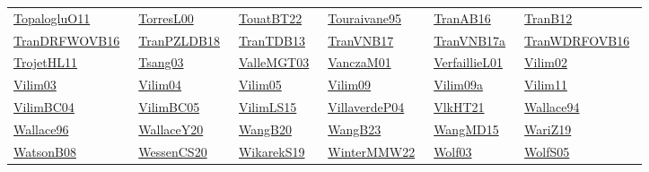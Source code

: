 \begin{longtable}{*{6}{l}}
\href{works/TopalogluO11.pdf}{TopalogluO11}~\cite{TopalogluO11} & \href{works/TorresL00.pdf}{TorresL00}~\cite{TorresL00} & \href{works/TouatBT22.pdf}{TouatBT22}~\cite{TouatBT22} & \href{works/Touraivane95.pdf}{Touraivane95}~\cite{Touraivane95} & \href{works/TranAB16.pdf}{TranAB16}~\cite{TranAB16} & \href{works/TranB12.pdf}{TranB12}~\cite{TranB12}\\ 
\href{works/TranDRFWOVB16.pdf}{TranDRFWOVB16}~\cite{TranDRFWOVB16} & \href{works/TranPZLDB18.pdf}{TranPZLDB18}~\cite{TranPZLDB18} & \href{works/TranTDB13.pdf}{TranTDB13}~\cite{TranTDB13} & \href{works/TranVNB17.pdf}{TranVNB17}~\cite{TranVNB17} & \href{works/TranVNB17a.pdf}{TranVNB17a}~\cite{TranVNB17a} & \href{works/TranWDRFOVB16.pdf}{TranWDRFOVB16}~\cite{TranWDRFOVB16}\\ 
\href{works/TrojetHL11.pdf}{TrojetHL11}~\cite{TrojetHL11} & \href{works/Tsang03.pdf}{Tsang03}~\cite{Tsang03} & \href{works/ValleMGT03.pdf}{ValleMGT03}~\cite{ValleMGT03} & \href{works/VanczaM01.pdf}{VanczaM01}~\cite{VanczaM01} & \href{works/VerfaillieL01.pdf}{VerfaillieL01}~\cite{VerfaillieL01} & \href{works/Vilim02.pdf}{Vilim02}~\cite{Vilim02}\\ 
\href{works/Vilim03.pdf}{Vilim03}~\cite{Vilim03} & \href{works/Vilim04.pdf}{Vilim04}~\cite{Vilim04} & \href{works/Vilim05.pdf}{Vilim05}~\cite{Vilim05} & \href{works/Vilim09.pdf}{Vilim09}~\cite{Vilim09} & \href{works/Vilim09a.pdf}{Vilim09a}~\cite{Vilim09a} & \href{works/Vilim11.pdf}{Vilim11}~\cite{Vilim11}\\ 
\href{works/VilimBC04.pdf}{VilimBC04}~\cite{VilimBC04} & \href{works/VilimBC05.pdf}{VilimBC05}~\cite{VilimBC05} & \href{works/VilimLS15.pdf}{VilimLS15}~\cite{VilimLS15} & \href{}{VillaverdeP04}~\cite{VillaverdeP04} & \href{works/VlkHT21.pdf}{VlkHT21}~\cite{VlkHT21} & \href{}{Wallace94}~\cite{Wallace94}\\ 
\href{works/Wallace96.pdf}{Wallace96}~\cite{Wallace96} & \href{works/WallaceY20.pdf}{WallaceY20}~\cite{WallaceY20} & \href{works/WangB20.pdf}{WangB20}~\cite{WangB20} & \href{works/WangB23.pdf}{WangB23}~\cite{WangB23} & \href{works/WangMD15.pdf}{WangMD15}~\cite{WangMD15} & \href{}{WariZ19}~\cite{WariZ19}\\ 
\href{works/WatsonB08.pdf}{WatsonB08}~\cite{WatsonB08} & \href{works/WessenCS20.pdf}{WessenCS20}~\cite{WessenCS20} & \href{works/WikarekS19.pdf}{WikarekS19}~\cite{WikarekS19} & \href{works/WinterMMW22.pdf}{WinterMMW22}~\cite{WinterMMW22} & \href{works/Wolf03.pdf}{Wolf03}~\cite{Wolf03} & \href{works/WolfS05.pdf}{WolfS05}~\cite{WolfS05}\\ 

\end{longtable}

